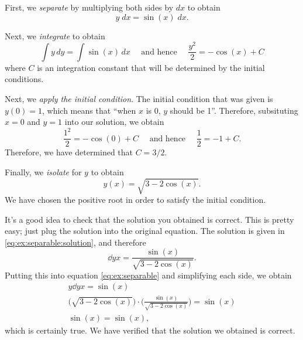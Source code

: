 \documentclass{article}
\begin{document}
\begin{solution}

  First, we \emph{separate} by
  multiplying both sides by $dx$ to obtain
  \begin{equation*}
    y \;dx = \sin(x) \;dx.
  \end{equation*}


  Next, we \emph{integrate} to obtain
  \begin{equation*}
    \int y \, dy = \int \sin(x) \, dx
    \quad \text{ and hence } \quad
    \frac{y^2}{2} = -\cos(x) + C
  \end{equation*}
  where $C$ is an integration constant that will be determined by the
  initial conditions.


  Next, we \emph{apply the initial condition}.  The initial condition
  that was given is $y(0) = 1$, which means that ``when $x$ is 0, $y$
  should be 1''.  Therefore, subsituting $x=0$ and $y=1$ into our
  solution, we obtain
  \begin{equation*}
    \frac{1^2}{2} = -\cos(0) + C
    \quad \text{ and hence } \quad
    \frac{1}{2} = -1 + C.
  \end{equation*}
  Therefore, we have determined that $C = 3/2$.


  Finally, we \emph{isolate} for $y$ to obtain
  \begin{equation} \label{eq:ex:separable:solution}
    y(x) = \sqrt{3 - 2\cos(x)}.
  \end{equation}
  We have chosen the positive root in order to satisfy the initial
  condition.


  It's a good idea to check that the solution you obtained is correct.
  This is pretty easy; just plug the solution into the original
  equation.  The solution is given in
  \eqref{eq:ex:separable:solution}, and therefore
  \begin{equation*}
    \dd{y}{x} = \frac{\sin(x)}{\sqrt{3 -2 \cos(x)}}.
  \end{equation*}
  Putting this into equation \eqref{eq:ex:separable} and simplifying
  each side, we obtain
  \begin{gather*}
    y \dd{y}{x} = \sin(x) \\
    \bigl(\sqrt{3 - 2\cos(x)}\bigr) \cdot
    \biggl(\frac{\sin(x)}{\sqrt{3 -2 \cos(x)}}\biggr) = \sin(x) \\
    \sin(x) = \sin(x),
  \end{gather*}
  which is certainly true.  We have verified that the solution we
  obtained is correct.
\end{solution}
\end{document}
